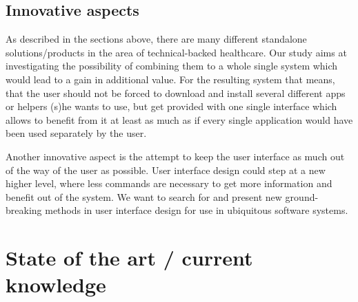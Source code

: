 \documentclass[a4paper,11pt]{article}
\providecommand*{\note}[1]{\small \textcolor{RoyalBlue}{\begin{minipage}{\textwidth}{#1}\end{minipage}}}
\begin{document}
\subsection{Innovative aspects}

As described in the sections above, there are many different standalone solutions/products in the area of technical-backed healthcare. Our study aims at investigating the possibility of combining them to a whole single system which would lead to a gain in additional value. For the resulting system that means, that the user should not be forced to download and install several different apps or helpers (s)he wants to use, but get provided with one single interface which allows to benefit from it at least as much as if every single application would have been used separately by the user.

Another innovative aspect is the attempt to keep the user interface as much out of the way of the user as possible. User interface design could step at a new higher level, where less commands are necessary to get more information and benefit out of the system. We want to search for and present new ground-breaking methods in user interface design for use in ubiquitous software systems.

\section{State of the art / current knowledge}
\label{sect:star}

\end{document}
